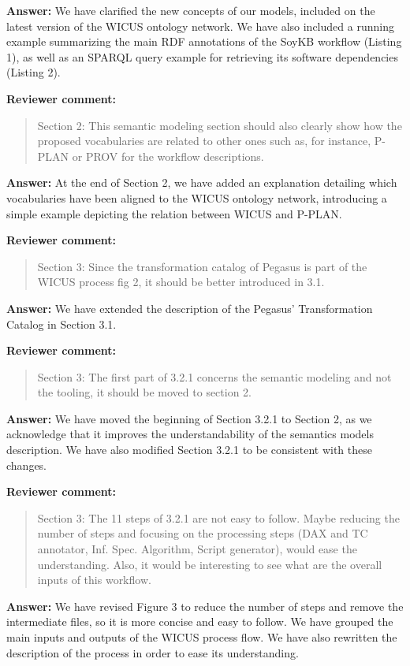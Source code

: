 \documentclass{letter}
\newenvironment{review}%
{\textbf{Reviewer comment:}\begin{quote}}%
{\end{quote}}%
\newcommand{\answer}[1]{%
      \textbf{Answer:} #1}
\begin{document}
\begin{letter}{}
\answer{We have clarified the new concepts of our models, included on the latest version of the WICUS ontology network. We have also included a running example summarizing the main RDF annotations of the SoyKB workflow (Listing 1), as well as an SPARQL query example for retrieving its software dependencies (Listing 2).}


\begin{review}
Section 2: This semantic modeling section should also clearly show how the proposed vocabularies are related to other ones such as, for instance, P-PLAN or PROV for the workflow descriptions.
\end{review}

\answer{At the end of Section 2, we have added an explanation detailing which vocabularies have been aligned to the WICUS ontology network, introducing a simple example depicting the relation between WICUS and P-PLAN.}


\begin{review}
Section 3: Since the transformation catalog of Pegasus is part of the WICUS process fig 2, it should be better introduced in 3.1.
\end{review}

\answer{We have extended the description of the Pegasus' Transformation Catalog in Section 3.1.}


\begin{review}
Section 3: The first part of 3.2.1 concerns the semantic modeling and not the tooling, it should be moved to section 2.
\end{review}

\answer{We have moved the beginning of Section 3.2.1 to Section 2, as we acknowledge that it improves the understandability of the semantics models description. We have also modified Section 3.2.1 to be consistent with these changes.}


\begin{review}
Section 3: The 11 steps of 3.2.1 are not easy to follow. Maybe reducing the number of steps and focusing on the processing steps (DAX and TC annotator, Inf. Spec. Algorithm, Script generator), would ease the understanding. Also, it would be interesting to see what are the overall inputs of this workflow.
\end{review}

\answer{We have revised Figure 3 to reduce the number of steps and remove the intermediate files, so it is more concise and easy to follow. We have grouped the main inputs and outputs of the WICUS process flow. We have also rewritten the description of the process in order to ease its understanding.}



\end{letter}
\end{document}
